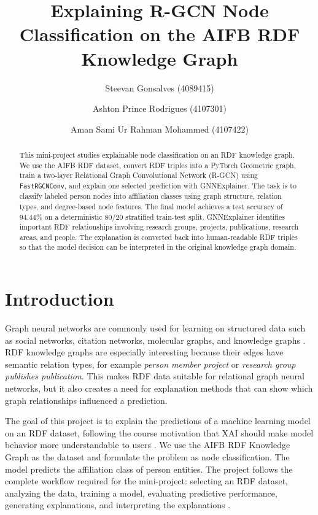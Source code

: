 \documentclass[runningheads]{llncs}
\begin{document}
\title{Explaining R-GCN Node Classification on the AIFB RDF Knowledge Graph}

\author{Steevan Gonsalves (4089415) \and Ashton Prince Rodrigues (4107301) \and Aman Sami Ur Rahman Mohammed (4107422)}


\maketitle

\begin{abstract}
This mini-project studies explainable node classification on an RDF knowledge graph. We use the AIFB RDF dataset, convert RDF triples into a PyTorch Geometric graph, train a two-layer Relational Graph Convolutional Network (R-GCN) using \texttt{FastRGCNConv}, and explain one selected prediction with GNNExplainer. The task is to classify labeled person nodes into affiliation classes using graph structure, relation types, and degree-based node features. The final model achieves a test accuracy of 94.44\% on a deterministic 80/20 stratified train-test split. GNNExplainer identifies important RDF relationships involving research groups, projects, publications, research areas, and people. The explanation is converted back into human-readable RDF triples so that the model decision can be interpreted in the original knowledge graph domain.
\end{abstract}

\section{Introduction}

Graph neural networks are commonly used for learning on structured data such as social networks, citation networks, molecular graphs, and knowledge graphs \cite{pyg,lecture-neural}. RDF knowledge graphs are especially interesting because their edges have semantic relation types, for example \emph{person member project} or \emph{research group publishes publication}. This makes RDF data suitable for relational graph neural networks, but it also creates a need for explanation methods that can show which graph relationships influenced a prediction.

The goal of this project is to explain the predictions of a machine learning model on an RDF dataset, following the course motivation that XAI should make model behavior more understandable to users \cite{lecture-intro}. We use the AIFB RDF Knowledge Graph as the dataset and formulate the problem as node classification. The model predicts the affiliation class of person entities. The project follows the complete workflow required for the mini-project: selecting an RDF dataset, analyzing the data, training a model, evaluating predictive performance, generating explanations, and interpreting the explanations \cite{lecture-miniproject,lecture-org}.
\end{document}
